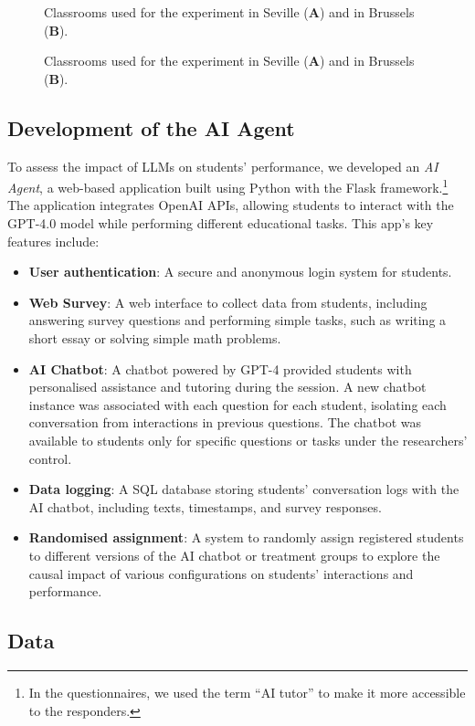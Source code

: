 \documentclass[
  12pt,
]{article}
\providecommand{\tightlist}{%
  \setlength{\itemsep}{0pt}\setlength{\parskip}{0pt}}
\begin{document}
\begin{figure}
\centering
{\label{fig:classrooms}Classrooms used for the experiment in Seville (\textbf{A}) and in Brussels (\textbf{B}).}
\caption{\label{fig:classrooms}Classrooms used for the experiment in Seville (\textbf{A}) and in Brussels (\textbf{B}).}
\end{figure}

\subsection{Development of the AI Agent}\label{development-of-the-ai-agent}

To assess the impact of LLMs on students' performance, we developed an \emph{AI Agent}, a web-based application built using Python with the Flask framework.\footnote{
  In the questionnaires, we used the term ``AI tutor'' to make it more accessible to the responders.} The application integrates OpenAI APIs, allowing students to interact with the GPT-4.0 model while performing different educational tasks. This app's key features include:

\begin{itemize}
\tightlist
\item
  \textbf{User authentication}: A secure and anonymous login system for students.
\item
  \textbf{Web Survey}: A web interface to collect data from students, including answering survey questions and performing simple tasks, such as writing a short essay or solving simple math problems.
\item
  \textbf{AI Chatbot}: A chatbot powered by GPT-4 provided students with personalised assistance and tutoring during the session. A new chatbot instance was associated with each question for each student, isolating each conversation from interactions in previous questions. The chatbot was available to students only for specific questions or tasks under the researchers' control.
\item
  \textbf{Data logging}: A SQL database storing students' conversation logs with the AI chatbot, including texts, timestamps, and survey responses.
\item
  \textbf{Randomised assignment}: A system to randomly assign registered students to different versions of the AI chatbot or treatment groups to explore the causal impact of various configurations on students' interactions and performance.
\end{itemize}

\subsection{Data}\label{data}
\end{document}
